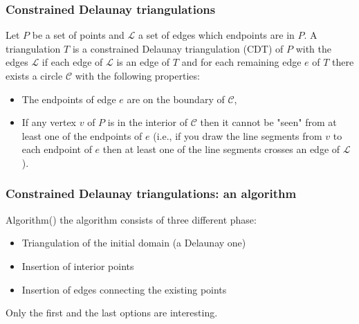 \documentclass[10pt]{beamer}
\begin{document}
\begin{frame}
	\frametitle{Constrained Delaunay triangulations}
	Let $P$ be a set of points and $\mathcal{L}$ a set of edges which endpoints are in $P$. A triangulation $T$ is a
	constrained Delaunay triangulation (CDT) of $P$ with the edges $\mathcal{L}$ if each edge of $\mathcal{L}$ is an edge of
	$T$ and for each remaining edge $e$ of $T$ there exists a circle $\mathcal{C}$ with the following
	properties:
	\begin{itemize}
		\item The endpoints of edge $e$ are on the boundary of $\mathcal{C}$,
		\item If any vertex $v$ of $P$ is in the interior of $\mathcal{C}$ then it cannot be "seen" from at
		least one of the endpoints of $e$ (i.e., if you draw the line segments from $v$ to each endpoint of $e$ then at least one of the line segments crosses an edge of
		$\mathcal{L}$).
	\end{itemize}
\end{frame}
\begin{frame}
	\frametitle{Constrained Delaunay triangulations: an algorithm}
	\begin{block}{Algorithm(\cite{DEFLORIANI})}
		the algorithm consists of three different phase:
		\begin{itemize}
			\item Triangulation of the initial domain (a Delaunay one)
			\item Insertion of interior points
			\item Insertion of edges connecting the existing points
		\end{itemize}
		
	\end{block}
	Only the first and the last options are interesting.
\end{frame}
\end{document}
